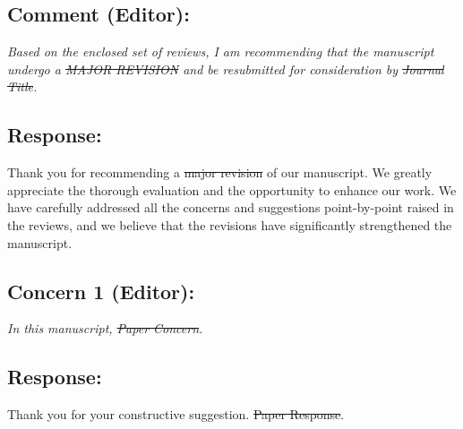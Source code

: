 
{}
\subsection*{Comment (Editor):}
\textit{Based on the enclosed set of reviews, I am recommending that the manuscript undergo a \sout{MAJOR REVISION} and
be resubmitted for consideration by \sout{Journal Title}.}

\subsection*{Response:}
Thank you for recommending a \sout{major revision} of our manuscript.
We greatly appreciate the thorough evaluation and the opportunity to enhance our work.
We have carefully addressed all the concerns and suggestions point-by-point raised in the reviews,
and we believe that the revisions have significantly strengthened the manuscript.

{}
\subsection*{Concern 1 (Editor):}
\textit{In this manuscript, \sout{Paper Concern}.}

\subsection*{Response:}
Thank you for your constructive suggestion.
\sout{Paper Response}.

